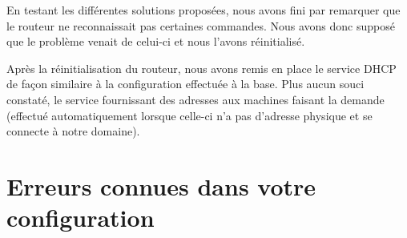 \documentclass{article}
\begin{document}
En testant les différentes solutions proposées, nous avons fini par remarquer que le routeur
ne reconnaissait pas certaines commandes. Nous avons donc supposé que le problème venait de celui-ci
et nous l'avons réinitialisé.

Après la réinitialisation du routeur, nous avons remis en place le service DHCP de façon similaire 
à la configuration effectuée à la base. Plus aucun souci constaté, le service fournissant des adresses
aux machines faisant la demande (effectué automatiquement lorsque celle-ci n'a pas d'adresse physique et se connecte à notre domaine).
\section{Erreurs connues dans votre configuration}
\end{document}
